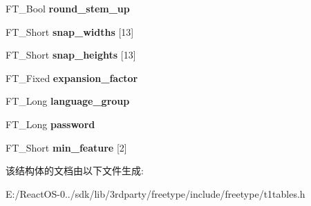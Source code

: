 \begin{DoxyCompactItemize}
\mbox{\label{struct_p_s___private_rec___a96b9729811d02146a87ffdc5c254bbe9}} 
F\+T\+\_\+\+Bool {\bfseries round\+\_\+stem\+\_\+up}
\item 
\mbox{\label{struct_p_s___private_rec___a39cf1a4b21280bf8082ccba0f4824a8a}} 
F\+T\+\_\+\+Short {\bfseries snap\+\_\+widths} \mbox{[}13\mbox{]}
\item 
\mbox{\label{struct_p_s___private_rec___a3583caf0cc05de2afac098574ed0bc4b}} 
F\+T\+\_\+\+Short {\bfseries snap\+\_\+heights} \mbox{[}13\mbox{]}
\item 
\mbox{\label{struct_p_s___private_rec___a45cf6e07c4c26f029e66998e6cad9fa0}} 
F\+T\+\_\+\+Fixed {\bfseries expansion\+\_\+factor}
\item 
\mbox{\label{struct_p_s___private_rec___afc2a7f950a174577ebfc062bb1598f5c}} 
F\+T\+\_\+\+Long {\bfseries language\+\_\+group}
\item 
\mbox{\label{struct_p_s___private_rec___a309a871cdeb6f658d8fbff23fa13b667}} 
F\+T\+\_\+\+Long {\bfseries password}
\item 
\mbox{\label{struct_p_s___private_rec___af8c829e03c424b1f12b2c9cd4041a868}} 
F\+T\+\_\+\+Short {\bfseries min\+\_\+feature} \mbox{[}2\mbox{]}
\end{DoxyCompactItemize}


该结构体的文档由以下文件生成\+:\begin{DoxyCompactItemize}
\item 
E\+:/\+React\+O\+S-\/0../sdk/lib/3rdparty/freetype/include/freetype/t1tables.\+h\end{DoxyCompactItemize}
